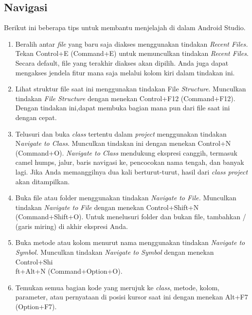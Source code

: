 \subsection{Navigasi}
\par Berikut ini beberapa tips untuk membantu menjelajah di dalam Android Studio.
\begin{enumerate}
    \item Beralih antar \textit{file} yang baru saja diakses menggunakan tindakan \textit{Recent Files.} Tekan Control+E (Command+E) untuk memunculkan tindakan \textit{Recent Files}. Secara default, file yang terakhir diakses akan dipilih. Anda juga dapat mengakses jendela fitur mana saja melalui kolom kiri dalam tindakan ini.
    \item Lihat struktur file saat ini menggunakan tindakan File \textit{Structure}. Munculkan tindakan\textit{ File Structure }dengan menekan Control+F12 (Command+F12). Dengan tindakan ini,dapat membuka bagian mana pun dari file saat ini dengan cepat.
    \item Telusuri dan buka\textit{ class }tertentu dalam \textit{project} menggunakan tindakan N\textit{avigate to Class}. Munculkan tindakan ini dengan menekan Control+N (Command+O). \textit{Navigate to Class } mendukung ekspresi canggih, termasuk camel humps, jalur, baris navigasi ke, pencocokan nama tengah, dan banyak lagi. Jika Anda memanggilnya dua kali berturut-turut, hasil dari \textit{class project} akan ditampilkan.
    \item Buka file atau folder menggunakan tindakan \textit{Navigate to File.} Munculkan tindakan\textit{ Navigate to File} dengan menekan Control+Shift+N (Command+Shift+O). Untuk menelusuri folder dan bukan file, tambahkan / (garis miring) di akhir ekspresi Anda.
    \item Buka metode atau kolom menurut nama menggunakan tindakan \textit{Navigate to Symbol.} Munculkan tindakan \textit{Navigate to Symbol} dengan menekan Control+Shi\\ft+Alt+N (Command+Option+O).
    \item Temukan semua bagian kode yang merujuk ke\textit{ class}, metode, kolom, parameter, atau pernyataan di posisi kursor saat ini dengan menekan Alt+F7 (Option+F7).
\end{enumerate}
